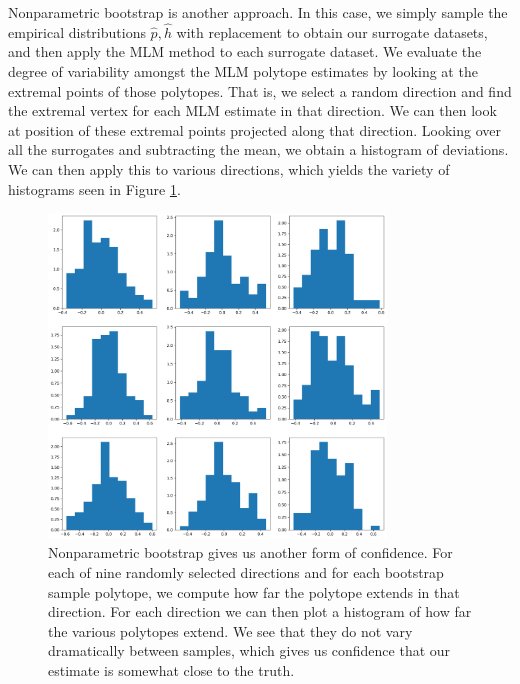 Nonparametric bootstrap is another approach.  In this case, we simply sample the empirical distributions $\hat p,\hat h$ with replacement to obtain our surrogate datasets, and then apply the MLM method to each surrogate dataset.  We evaluate the degree of variability amongst the MLM polytope estimates by looking at the extremal points of those polytopes.  That is, we select a random direction and find the extremal vertex for each MLM estimate in that direction.  We can then look at position of these extremal points projected along that direction.  Looking over all the surrogates and subtracting the mean, we obtain a histogram of deviations.  We can then apply this to various directions, which yields the variety of histograms seen in Figure \ref{fig:allenbootstrap}.   

\begin{figure}
\includegraphics[width=0.8\textwidth]{pics/allenbootstrapnonparametric}
\caption{Nonparametric bootstrap gives us another form of confidence.  For each of nine randomly selected directions and for each bootstrap sample polytope, we compute how far the polytope extends in that direction.   For each direction we can then plot a histogram of how far the various polytopes extend.  We see that they do not vary dramatically between samples, which gives us confidence that our estimate is somewhat close to the truth.\label{fig:allenbootstrap}}
\end{figure}

